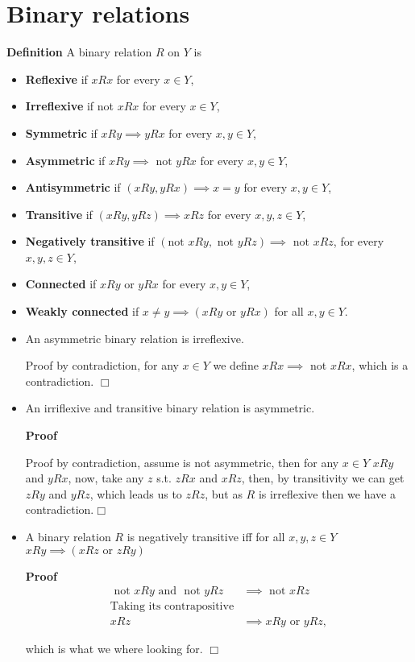 \documentclass{article}
\theoremstyle{definition}
\def\tor{\text{ or }}
\def\tand{\text{ and }}
\def\tnot{\text{ not }}
\begin{document}
\section{Binary relations}
{\bf Definition } A binary relation $R$ on $Y$ is
\begin{itemize}
\item {\bf Reflexive} if $xRx$ for every $x\in Y$,
\item {\bf Irreflexive} if not $xRx$ for every $x\in Y$,
\item {\bf Symmetric} if $xRy\implies yRx$ for every $x,y\in Y$,
\item {\bf Asymmetric} if $xRy\implies\text{ not }yRx$ for every $x,y \in Y$,
\item {\bf Antisymmetric} if $(xRy,yRx)\implies x=y$ for every $x,y\in Y$,
\item {\bf Transitive} if $(xRy,yRz)\implies xRz$ for every $x,y,z\in Y$,
\item {\bf Negatively transitive} if $(\text{not }xRy,\text{ not }yRz)\implies\text{ not }xRz$, for every $x,y,z\in Y$,
\item {\bf Connected} if $xRy$ or $yRx$ for every $x,y\in Y$,
\item {\bf Weakly connected} if $x\not=y\implies (xRy\text{ or }yRx)$ for all $x,y\in Y$.
\end{itemize}


\begin{itemize}
\item An asymmetric binary relation is irreflexive.


Proof by contradiction, for any $x\in Y$ we define $xRx\implies$ not $xRx$, which is a contradiction. $\Box$

\item An irriflexive and transitive binary relation is asymmetric.

{\bf Proof}

Proof by contradiction, assume is not asymmetric, then for any $x\in Y$ $xRy$ and $yRx$,
now, take any $z$ s.t. $zRx$ and $xRz$, then, by transitivity we can get $zRy$ and $yRz$,
which leads us to $zRz$, but as $R$ is irreflexive then we have a contradiction.$\Box$

\item A binary relation  $R$ is negatively transitive iff for all $x,y,z\in Y$ $xRy\implies (xRz\text{ or }zRy)$

{\bf Proof}
\begin{align*}
\tnot xRy\tand \tnot yRz &\implies \tnot xRz \\
\text{Taking its contrapositive}\\
xRz&\implies xRy\tor yRz,
\end{align*}

which is what we where looking for. $\Box$
\end{itemize}
\end{document}
